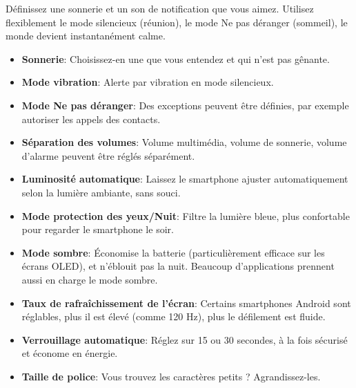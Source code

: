 


Définissez une sonnerie et un son de notification que vous aimez. Utilisez flexiblement le mode silencieux (réunion), le mode Ne pas déranger (sommeil), le monde devient instantanément calme.

\begin{itemize}
  \item \textbf{Sonnerie}: Choisissez-en une que vous entendez et qui n'est pas gênante.
  \item \textbf{Mode vibration}: Alerte par vibration en mode silencieux.
  \item \textbf{Mode Ne pas déranger}: Des exceptions peuvent être définies, par exemple autoriser les appels des contacts.
  \item \textbf{Séparation des volumes}: Volume multimédia, volume de sonnerie, volume d'alarme peuvent être réglés séparément.
\end{itemize}


\begin{itemize}
  \item \textbf{Luminosité automatique}: Laissez le smartphone ajuster automatiquement selon la lumière ambiante, sans souci.
  \item \textbf{Mode protection des yeux/Nuit}: Filtre la lumière bleue, plus confortable pour regarder le smartphone le soir.
  \item \textbf{Mode sombre}: Économise la batterie (particulièrement efficace sur les écrans OLED), et n'éblouit pas la nuit. Beaucoup d'applications prennent aussi en charge le mode sombre.
  \item \textbf{Taux de rafraîchissement de l'écran}: Certains smartphones Android sont réglables, plus il est élevé (comme 120 Hz), plus le défilement est fluide.
  \item \textbf{Verrouillage automatique}: Réglez sur 15 ou 30 secondes, à la fois sécurisé et économe en énergie.
  \item \textbf{Taille de police}: Vous trouvez les caractères petits ? Agrandissez-les.
\end{itemize}

